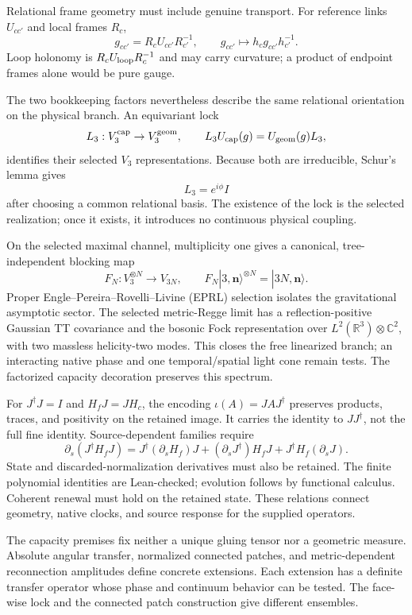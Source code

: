 \documentclass[11pt]{article}
\begin{document}
Relational frame geometry must include genuine transport. For reference links $U_{cc'}$ and local frames $R_c$,
\[
g_{cc'}=R_cU_{cc'}R_{c'}^{-1},\qquad
g_{cc'}\mapsto h_cg_{cc'}h_{c'}^{-1}.
\]
Loop holonomy is $R_cU_{\rm loop}R_c^{-1}$ and may carry curvature; a product of endpoint frames alone would be pure gauge.

The two bookkeeping factors nevertheless describe the same relational orientation on the physical branch. An equivariant lock
\[
L_3:V_3^{\rm cap}\to V_3^{\rm geom},
\qquad
L_3U_{\rm cap}(g)=U_{\rm geom}(g)L_3,
\]
identifies their selected $V_3$ representations. Because both are irreducible, Schur's lemma gives
\[
\boxed{L_3=e^{i\phi}I}
\]
after choosing a common relational basis. The existence of the lock is the selected realization; once it exists, it introduces no continuous physical coupling.

On the selected maximal channel, multiplicity one gives a canonical, tree-independent blocking map
\[
\boxed{F_N:V_3^{\otimes N}\to V_{3N}},
\qquad
F_N|3,\mathbf n\rangle^{\otimes N}=|3N,\mathbf n\rangle.
\]
Proper Engle--Pereira--Rovelli--Livine (EPRL) selection isolates the gravitational asymptotic sector. The selected metric-Regge limit has a reflection-positive Gaussian TT covariance and the bosonic Fock representation over $L^2(\mathbb R^3)\otimes\mathbb C^2$, with two massless helicity-two modes. This closes the free linearized branch; an interacting native phase and one temporal/spatial light cone remain tests. The factorized capacity decoration preserves this spectrum.

For $J^\dagger J=I$ and $H_fJ=JH_c$, the encoding $\iota(A)=JAJ^\dagger$ preserves products, traces, and positivity on the retained image. It carries the identity to $JJ^\dagger$, not the full fine identity. Source-dependent families require
\[
\partial_s(J^\dagger H_fJ)=J^\dagger(\partial_sH_f)J
+(\partial_sJ^\dagger)H_fJ+J^\dagger H_f(\partial_sJ).
\]
State and discarded-normalization derivatives must also be retained. The finite polynomial identities are Lean-checked; evolution follows by functional calculus. Coherent renewal must hold on the retained state. These relations connect geometry, native clocks, and source response for the supplied operators.

The capacity premises fix neither a unique gluing tensor nor a geometric measure. Absolute angular transfer, normalized connected patches, and metric-dependent reconnection amplitudes define concrete extensions. Each extension has a definite transfer operator whose phase and continuum behavior can be tested. The face-wise lock and the connected patch construction give different ensembles.
\end{document}
